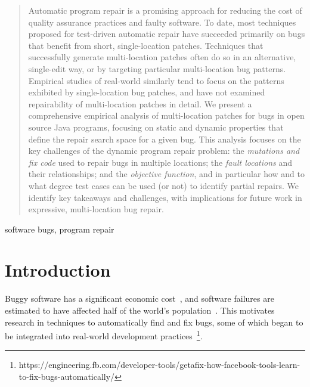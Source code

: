 \documentclass[10pt, conference]{IEEEtran}
\newcommand\todo[1]{\textcolor{red}{#1}}
\begin{document}
\begin{abstract}
    Automatic program repair is a promising approach for reducing the
    cost of quality assurance practices and faulty software. To date, most
    techniques proposed for test-driven automatic repair have succeeded
    primarily on bugs that benefit from short, single-location patches. Techniques
    that successfully generate multi-location patches often do so in an
    alternative, single-edit way, or by targeting particular multi-location bug
    patterns. Empirical studies of real-world similarly tend to focus on the
    patterns exhibited by single-location bug patches, and have not examined repairability
    of multi-location patches in detail. We present a comprehensive empirical analysis
    of multi-location patches for bugs in open source Java programs, focusing on static and
    dynamic properties that define the repair search space for a given bug.
    This analysis focuses on the key challenges of the dynamic program repair
    problem: the \emph{mutations and fix code} used to repair bugs in multiple locations;
    the \emph{fault locations} and their relationships; and the \emph{objective
      function}, and in particular how and to what degree test cases can be used
    (or not) to identify partial repairs. We identify key takeaways and
    challenges, with implications for future work in expressive, multi-location bug
    repair.
\end{abstract}

\begin{IEEEkeywords}
  software bugs, program repair
\end{IEEEkeywords}

\newcommand{\rqorinsight}[2]{
  \setlength{\fboxsep}{0.8em}
  \vspace{0.5em}
  \begin{center}
  \Ovalbox{\begin{minipage}{0.9\linewidth}
    \textbf{RQ#1:} #2
    \end{minipage}}
  \end{center}
  \vspace{0.5em}}

\section{Introduction}


Buggy software has a significant economic cost~\cite{cambridge-study}, and
software failures are estimated to have affected half of the world's
population~\cite{tricentis}.  This motivates research in
techniques to automatically find and fix bugs, some of which
began to be integrated into
real-world development practices~\cite{iceland,sapfix}\footnote{https://engineering.fb.com/developer-tools/getafix-how-facebook-tools-learn-to-fix-bugs-automatically/}.
\end{document}
